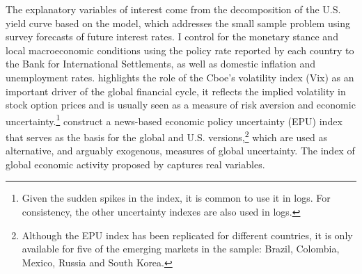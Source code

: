 {%
The explanatory variables of interest come from the decomposition of the U.S. yield curve based on the \cite{KimWright:2005} model, which 
addresses the small sample problem using survey forecasts of future interest rates.
I control for the monetary stance and local macroeconomic conditions using the policy rate reported by each country to the Bank for International Settlements, as well as domestic inflation and unemployment rates. %
\cite{Rey:2013} highlights the role of the Cboe's volatility index (Vix) as an important driver of the global financial cycle,
it reflects the implied volatility in stock option prices and is usually seen as a measure of risk aversion and economic uncertainty.\footnote{ Given the sudden spikes in the index, it is common to use it in logs. For consistency, the other uncertainty indexes are also used in logs.}
\cite{BakerBloomDavis:2016} construct a news-based economic policy uncertainty (EPU) index that serves as the basis for the global and U.S. versions,\footnote{ Although the EPU index has been replicated for different countries, it is only available for five of the emerging markets in the sample: Brazil, Colombia, Mexico, Russia and South Korea.} %
which are used as alternative, and arguably exogenous, measures of global uncertainty.
The index of global economic activity %
proposed by \cite{Hamilton:2019} captures real variables. %
}
